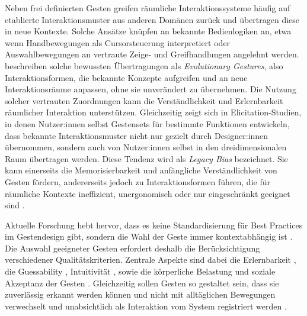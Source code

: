 Neben frei definierten Gesten greifen räumliche Interaktionssysteme häufig auf etablierte Interaktionsmuster aus anderen Domänen zurück und übertragen diese in neue Kontexte. Solche Ansätze knüpfen an bekannte Bedienlogiken an, etwa wenn Handbewegungen als Cursorsteuerung interpretiert oder Auswahlbewegungen an vertraute Zeige- und Greifhandlungen angelehnt werden. \textcite{williamsOrtega2020evolutionaryGesturesWhenAGestureIsNotQuireLegacyBiased} beschreiben solche bewussten Übertragungen als \textit{Evolutionary Gestures}, also Interaktionsformen, die bekannte Konzepte aufgreifen und an neue Interaktionsräume anpassen, ohne sie unverändert zu übernehmen. Die Nutzung solcher vertrauten Zuordnungen kann die Verständlichkeit und Erlernbarkeit räum\-licher Interaktion unterstützen.
Gleichzeitig zeigt sich in Elicitation-Studien, in denen Nutzer:innen selbst Gestensets für bestimmte Funktionen entwickeln, dass bekannte Interaktionsmuster nicht nur gezielt durch Designer:innen übernommen, sondern auch von Nutzer:innen selbst in den dreidimensionalen Raum übertragen werden. Diese Tendenz wird als \textit{Legacy Bias} bezeichnet. Sie kann einerseits die Memorisierbarkeit und anfängliche Verständlichkeit von Gesten fördern, andererseits jedoch zu Interaktionsformen führen, die für räumliche Kontexte ineffizient, unergonomisch oder nur eingeschränkt geeignet sind \parencite{pasquale2024empiricalevaluationdefiningmidair}.

Aktuelle Forschung hebt hervor, dass es keine Standardisierung für Best Practices im Gestendesign gibt, sondern die Wahl der Geste immer kontextabhängig ist \parencite{spittle2023reviewinteractiontechniquesforimmersiveenvironments, gavgiotaki2023gesturebasedinteractionforarsystemsreview}.
Die Auswahl geeigneter Gesten erfordert deshalb die Berücksichtigung verschiedener Qualitätskriterien. Zentrale Aspekte sind dabei die Erlernbarkeit \parencite{kostic2024exploringmidairhandinteractionindatavisualization}, die Guessability \parencite{wobbrock2005discoverability}, Intuitivität \parencite{gavgiotaki2023gesturebasedinteractionforarsystemsreview}, sowie die körperliche Belastung und soziale Akzeptanz der Gesten \parencite{mueller2010requirementsAndDesignSpaceForInteractivePublicDisplays, hincapi2014metrictoquantifyarmfatigue}. Gleichzeitig sollen Gesten so gestaltet sein, dass sie zuverlässig erkannt werden können und nicht mit alltäglichen Bewegungen verwechselt und unabsichtlich als Interaktion vom System registriert werden \parencite{kostic2024exploringmidairhandinteractionindatavisualization}.

